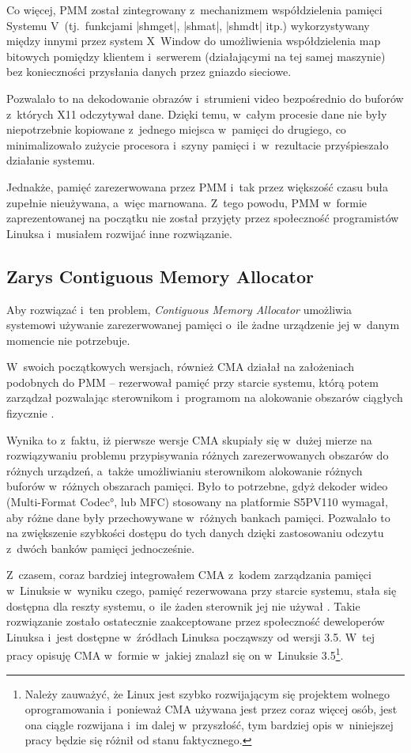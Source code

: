 Co więcej, PMM został zintegrowany z~mechanizmem współdzielenia
pamięci Systemu V~(tj.\ funkcjami \code|shmget|,
\code|shmat|, \code|shmdt| itp.) wykorzystywany między
innymi przez system X~Window do umożliwienia współdzielenia map
bitowych pomiędzy klientem i~serwerem (działającymi na tej samej
maszynie) bez konieczności przysłania danych przez gniazdo sieciowe.

Pozwalało to na dekodowanie obrazów i~strumieni video bezpośrednio do
buforów z~których X11 odczytywał dane.  Dzięki temu, w~całym procesie
dane nie były niepotrzebnie kopiowane z~jednego miejsca w~pamięci do
drugiego, co minimalizowało zużycie procesora i~szyny pamięci
i~w~rezultacie przyśpieszało działanie systemu.

Jednakże, pamięć zarezerwowana przez PMM i~tak przez większość czasu
buła zupełnie nieużywana, a~więc marnowana.  Z~tego powodu, PMM
w~formie zaprezentowanej na początku nie został przyjęty przez
społeczność programistów Linuksa i~musiałem rozwijać inne rozwiązanie.

\subsection{Zarys Contiguous Memory Allocator}

Aby rozwiązać i~ten problem, {\it Contiguous Memory Allocator}
umożliwia systemowi używanie zarezerwowanej pamięci o~ile żadne
urządzenie jej w~danym momencie nie potrzebuje.

W~swoich początkowych wersjach, również CMA działał na założeniach
podobnych do PMM -- rezerwował pamięć przy starcie systemu, którą
potem zarządzał pozwalając sterownikom i~programom na alokowanie
obszarów ciągłych fizycznie \cite{patch:cma-4}.

Wynika to z~faktu, iż pierwsze wersje CMA skupiały się w~dużej mierze
na rozwiązywaniu problemu przypisywania różnych zarezerwowanych
obszarów do różnych urządzeń, a~także umożliwianiu sterownikom
alokowanie różnych buforów w~różnych obszarach pamięci.  Było to
potrzebne, gdyż dekoder wideo (\ang{Multi-Format Codec}, lub MFC)
stosowany na platformie S5PV110 wymagał, aby różne dane były
przechowywane w~różnych bankach pamięci.  Pozwalało to na zwiększenie
szybkości dostępu do tych danych dzięki zastosowaniu odczytu z~dwóch
banków pamięci jednocześnie.

Z~czasem, coraz bardziej integrowałem CMA z~kodem zarządzania pamięci
w~Linuksie w~wyniku czego, pamięć rezerwowana przy starcie systemu,
stała się dostępna dla reszty systemu, o~ile żaden sterownik jej nie
używał \cite{patch:cma-24}.  Takie rozwiązanie zostało ostatecznie
zaakceptowane przez społeczność deweloperów Linuksa i~jest dostępne
w~źródłach Linuksa począwszy od wersji 3.5.  W~tej pracy opisuję CMA
w~formie w~jakiej znalazł się on w~Linuksie 3.5\footnote{Należy
  zauważyć, że Linux jest szybko rozwijającym się projektem wolnego
  oprogramowania i~ponieważ CMA używana jest przez coraz więcej osób,
  jest ona ciągle rozwijana i~im dalej w~przyszłość, tym bardziej opis
  w~niniejszej pracy będzie się różnił od stanu faktycznego.}.

